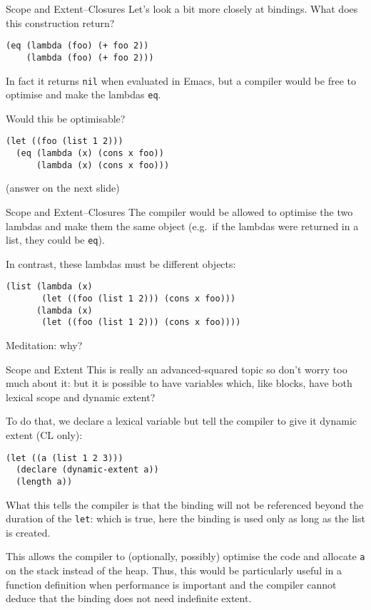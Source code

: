 \documentclass[presentation]{beamer}
\begin{document}
\begin{frame}[fragile]{Scope and Extent--Closures}
Let's look a bit more closely at bindings.  What does this construction return?
\begin{verbatim}
(eq (lambda (foo) (+ foo 2))
    (lambda (foo) (+ foo 2)))
\end{verbatim}
In fact it returns \texttt{nil} when evaluated in Emacs, but a compiler would be free to optimise and make the lambdas \texttt{eq}.

\medskip
Would this be optimisable?

\begin{verbatim}
(let ((foo (list 1 2)))
  (eq (lambda (x) (cons x foo))
      (lambda (x) (cons x foo)))
\end{verbatim}
(answer on the next slide)
\end{frame}

\begin{frame}[fragile]{Scope and Extent--Closures}
The compiler would be allowed to optimise the two lambdas and make them the same object (e.g.\ if the lambdas were returned in a list, they could be \texttt{eq}).

\medskip
In contrast, these lambdas must be different objects:
\begin{verbatim}
(list (lambda (x)
       (let ((foo (list 1 2))) (cons x foo)))
      (lambda (x)
       (let ((foo (list 1 2))) (cons x foo))))
\end{verbatim}
Meditation: why?
\end{frame}

\begin{frame}[fragile]{Scope and Extent}
This is really an advanced-squared topic so don't worry too much about it: but it is possible to have variables which, like blocks, have both lexical scope and dynamic extent?

\medskip
To do that, we declare a lexical variable but tell the compiler to give it dynamic extent (CL only):
\begin{verbatim}
(let ((a (list 1 2 3)))
  (declare (dynamic-extent a))
  (length a))
\end{verbatim}
What this tells the compiler is that the binding will not be referenced beyond the duration of the \texttt{let}: which is true, here the binding is used only as long as the list is created.

\medskip
This allows the compiler to (optionally, possibly) optimise the code and allocate \texttt{a} on the stack instead of the heap.  Thus, this would be particularly useful in a function definition when performance is important and the compiler cannot deduce that the binding does not need indefinite extent.
\end{frame}
\end{document}
